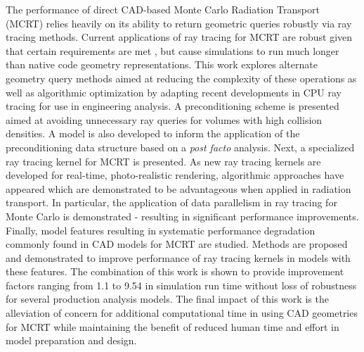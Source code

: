 


The performance of direct CAD-based Monte Carlo Radiation Transport (MCRT)
relies heavily on its ability to return geometric queries robustly via ray
tracing methods. Current applications of ray tracing for MCRT are robust given
that certain requirements are met \cite{Smith_2011}, but cause simulations to
run much longer than native code geometry representations. This work explores
alternate geometry query methods aimed at reducing the complexity of these
operations as well as algorithmic optimization by adapting recent developments
in CPU ray tracing for use in engineering analysis. A preconditioning scheme is
presented aimed at avoiding unnecessary ray queries for volumes with high
collision densities. A model is also developed to inform the application of the
preconditioning data structure based on a \textit{post facto} analysis. Next, a
specialized ray tracing kernel for MCRT is presented. As new ray tracing kernels
are developed for real-time, photo-realistic rendering, algorithmic approaches
have appeared which are demonstrated to be advantageous when applied in
radiation transport. In particular, the application of data parallelism in ray
tracing for Monte Carlo is demonstrated - resulting in significant performance
improvements. Finally, model features resulting in systematic performance
degradation commonly found in CAD models for MCRT are studied. Methods are
proposed and demonstrated to improve performance of ray tracing kernels in
models with these features. The combination of this work is shown to provide
improvement factors ranging from 1.1 to 9.54 in simulation run time without loss
of robustness for several production analysis models. The final impact of this
work is the alleviation of concern for additional computational time in using
CAD geometries for MCRT while maintaining the benefit of reduced human time and
effort in model preparation and design.
